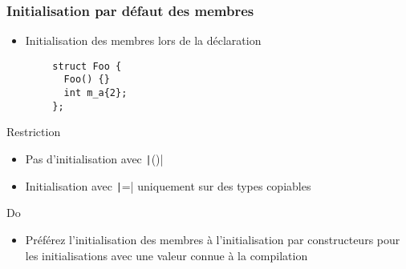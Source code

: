 \documentclass[C++.tex]{subfiles}
\begin{document}
\begin{frame}[fragile]
	\frametitle{Initialisation par défaut des membres}
	\begin{itemize}
		\item Initialisation des membres lors de la déclaration
	\end{itemize}

	\begin{verbatim}
		struct Foo {
		  Foo() {}
		  int m_a{2};
		};
	\end{verbatim}

	\begin{alertblock}{Restriction}
		\begin{itemize}
			\item Pas d'initialisation avec \texttt|()|
			\item Initialisation avec \texttt|=| uniquement sur des types copiables
		\end{itemize}
	\end{alertblock}

	\begin{exampleblock}{Do}
		\begin{itemize}
			\item Préférez l'initialisation des membres à l'initialisation par constructeurs pour les initialisations avec une valeur connue à la compilation
		\end{itemize}

	\end{exampleblock}


\end{frame}
\end{document}
